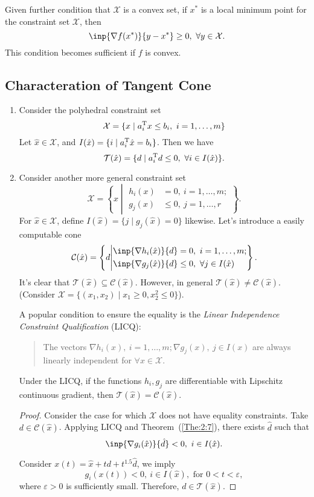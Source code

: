 \begin{theorem}\label{The:4:7}
Given further condition that $\mathcal{X}$ is a convex set, if $x^*$ is a local minimum point for the constraint set $\mathcal{X}$, then
\[
\inp{\nabla f(x^*)}{y-x^*}\ge0,\ \forall y\in\mathcal{X}.
\]
This condition becomes sufficient if $f$ is convex.
\end{theorem}

\subsection{Characteration of Tangent Cone}
\begin{enumerate}
\item
Consider the polyhedral constraint set
\[
\mathcal{X}=\{x\mid a_i\trans x\le b_i,\ i=1,\dots,m\}
\]
Let $\hat x\in\mathcal{X}$, and $I(\hat x)=\{i\mid a_i^{\mathrm T} \hat x=b_i\}$. Then we have
\[
\mathcal{T}(\hat x) = \{d\mid a_i\trans d\le0,\ \forall i\in I(\hat x)\}.
\]
\item
Consider another more general constraint set
\[
\mathcal{X}=\left\{x\middle|
\begin{aligned}
h_i(x) &= 0,\ i=1,\dots,m;\\
g_j(x) &\le0,\ j=1,\dots,r
\end{aligned}\right\}.
\]
For $\hat x\in\mathcal{X}$, define $I(\hat x) = \{j\mid g_j(\hat x)=0\}$ likewise.
Let's introduce a easily computable cone
\[
\mathcal{C}(\hat x) =\left\{d\middle|
\begin{aligned}
\inp{\nabla h_i(\hat x)}{d}&= 0,\ i=1,\dots,m;\\
\inp{\nabla g_j(\hat x)}{d} &\le0,\ \forall j\in I(\hat x)
\end{aligned}\right\}.
\]
It's clear that $\mathcal{T}(\hat x)\subseteq\mathcal{C}(\hat x)$. However, in general $\mathcal{T}(\hat x)\ne \mathcal{C}(\hat x)$. (Consider $\mathcal{X} = \{(x_1,x_2)\mid x_1\ge0,x_2^2\le0\}$).

A popular condition to ensure the equality is the \emph{Linear Independence Constraint Qualification} (LICQ):
\begin{quotation}
The vectors
$
\nabla h_i(x),\ i=1,\dots,m;
\nabla g_j(x), \ j\in I(x)
$
are always linearly independent for $\forall x\in\mathcal{X}$.
\end{quotation}

\begin{theorem}
Under the LICQ, if the functions $h_i,g_j$ are differentiable with Lipschitz continuous gradient, then $\mathcal{T}(\hat x)=\mathcal{C}(\hat x)$.
\end{theorem}
\begin{proof}
Consider the case for which $\mathcal{X}$ does not have equality constraints. Take $d\in\mathcal{C}(\hat x)$. Applying LICQ and Theorem~(\ref{The:2:7}), there exists $\hat d$ such that
\[
\inp{\nabla g_i(\hat x)}{\hat d}<0,\ i\in I(\hat x).
\]

Consider $x(t) = \hat x+ td+t^{1.5}\hat d$, we imply 
\[
g_i(x(t))<0,\ i\in I(\hat x),\text{ for }0<t<\varepsilon,
\]
where $\varepsilon>0$ is sufficiently small. Therefore, $d\in\mathcal{T}(\hat x)$.
\end{proof}
\end{enumerate}


